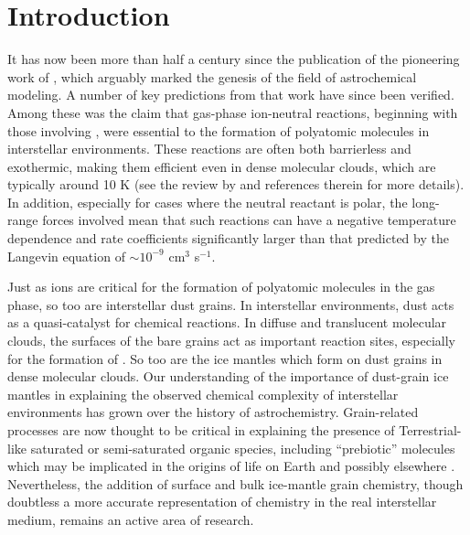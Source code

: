 \documentclass[journal=aesccq,manuscript=article,layout=twocolumn]{achemso}
\begin{document}
\section{Introduction}

It has now been more than half a century since the publication of the pioneering work of \citet{herbst_formation_1973}, which arguably marked the genesis of the field of astrochemical modeling. A number of key predictions from that work have since been verified. Among these was the claim that gas-phase ion-neutral reactions, beginning with those involving , were essential to the formation of polyatomic molecules in interstellar environments. These reactions are often both barrierless and exothermic, making them efficient even in dense molecular clouds, which are typically around 10 K (see the review by \citet{ceccarelli_organic_2022} and references therein for more details). In addition, especially for cases where the neutral reactant is polar, the long-range forces involved mean that such reactions can have a negative temperature dependence \citep{woon_quantum_2009} and rate coefficients significantly larger than that predicted by the Langevin equation\citep{hammes_principles_1978} of $\sim10^{-9}$ cm$^3$ s$^{-1}$. 

Just as ions are critical for the formation of polyatomic molecules in the gas phase, so too are interstellar dust grains. In interstellar environments, dust acts as a quasi-catalyst for chemical reactions. In diffuse and translucent molecular clouds, the surfaces of the bare grains act as important reaction sites, especially for the formation of  \citep{katz_molecular_1999,cazaux_molecular_2002,iqbal_h2_2014,acharyya_effect_2020}. So too are the ice mantles which form on dust grains in dense molecular clouds. 
Our understanding of the importance of dust-grain ice mantles in explaining the observed chemical complexity of interstellar environments has grown over the history of astrochemistry. Grain-related processes are now thought to be critical in explaining the presence of Terrestrial-like saturated or semi-saturated organic species, including ``prebiotic'' molecules which may be implicated in the origins of life on Earth and possibly elsewhere \citep{ceccarelli_organic_2022}. Nevertheless, the addition of surface and bulk ice-mantle grain chemistry, though doubtless a more accurate representation of chemistry in the real interstellar medium, remains an active area of research.
\end{document}
